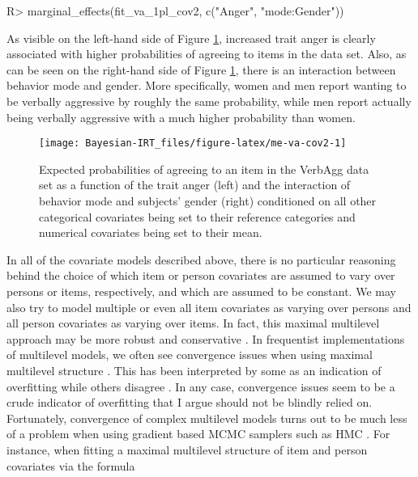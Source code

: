 \documentclass[jss]{jss}
\begin{document}
\begin{CodeChunk}

\begin{CodeInput}
R> marginal_effects(fit_va_1pl_cov2, c("Anger", "mode:Gender"))
\end{CodeInput}
\end{CodeChunk}

As visible on the left-hand side of Figure \ref{fig:me-va-cov2},
increased trait anger is clearly associated with higher probabilities of
agreeing to items in the  data set. Also, as can be seen
on the right-hand side of Figure \ref{fig:me-va-cov2}, there is an
interaction between behavior mode and gender. More specifically, women
and men report wanting to be verbally aggressive by roughly the same
probability, while men report actually being verbally aggressive with a
much higher probability than women.

\begin{CodeChunk}
\begin{figure}

{\centering \texttt{[image: Bayesian-IRT\_files/figure-latex/me-va-cov2-1]} 

}

\caption[Expected probabilities of agreeing to an item in the VerbAgg data set as a function of the trait anger (left) and the interaction of behavior mode and subjects' gender (right) conditioned on all other categorical covariates being set to their reference categories and numerical covariates being set to their mean]{Expected probabilities of agreeing to an item in the VerbAgg data set as a function of the trait anger (left) and the interaction of behavior mode and subjects' gender (right) conditioned on all other categorical covariates being set to their reference categories and numerical covariates being set to their mean.}\label{fig:me-va-cov2}
\end{figure}
\end{CodeChunk}

In all of the covariate models described above, there is no particular
reasoning behind the choice of which item or person covariates are
assumed to vary over persons or items, respectively, and which are
assumed to be constant. We may also try to model multiple or even all
item covariates as varying over persons and all person covariates as
varying over items. In fact, this maximal multilevel approach may be
more robust and conservative \citep{barr2013}. In frequentist
implementations of multilevel models, we often see convergence issues
when using maximal multilevel structure \citep{bates2015}. This has been
interpreted by some as an indication of overfitting \citep{bates2015}
while others disagree \citep{barr2013}. In any case, convergence issues
seem to be a crude indicator of overfitting that I argue should not be
blindly relied on. Fortunately, convergence of complex multilevel models
turns out to be much less of a problem when using gradient based MCMC
samplers such as HMC \citep{hoffman2014}. For instance, when fitting a
maximal multilevel structure of item and person covariates via the
formula
\end{document}
